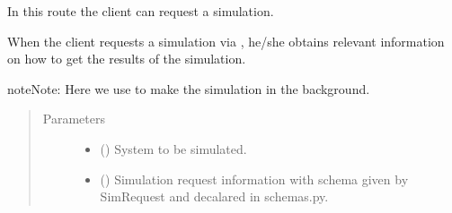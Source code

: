 \documentclass[a4paper,landscape,10pt,english]{sphinxmanual}
\begin{document}
\begin{fulllineitems}
\label{\detokenize{code_docs/simulation_API.controller:simulation_API.controller.main.api_simulate_sim_system}}
In this route the client can request a simulation.

When the client requests a simulation via ,
he/she obtains relevant information on how to get the results of the
simulation.

\begin{sphinxadmonition}{note}{Note:}
Here we use  to make the simulation in the
background.
\end{sphinxadmonition}
\begin{quote}\begin{description}
\item[{Parameters}] \leavevmode\begin{itemize}
\item {} 
 ({\hyperref[\detokenize{code_docs/simulation_API.controller:simulation_API.controller.schemas.SimSystem}]{}}) \textendash{} System to be simulated.

\item {} 
 ({\hyperref[\detokenize{code_docs/simulation_API.controller:simulation_API.controller.schemas.SimRequest}]{}}) \textendash{} Simulation request information with schema given by SimRequest and
decalared in schemas.py.


\end{itemize}
\end{description}
\end{quote}
\end{fulllineitems}
\end{document}
